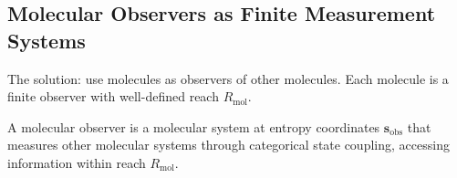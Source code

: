 \subsection{Molecular Observers as Finite Measurement Systems}

The solution: use molecules as observers of other molecules. Each molecule is a finite observer with well-defined reach $R_{\text{mol}}$.

\begin{definition}
\label{def:molecular_observer}
A molecular observer is a molecular system at entropy coordinates $\mathbf{s}_{\text{obs}}$ that measures other molecular systems through categorical state coupling, accessing information within reach $R_{\text{mol}}$.
\end{definition}


